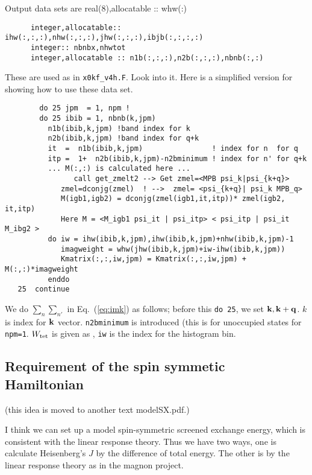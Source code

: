 \documentclass[a4paper,10pt,fleqn]{article}
\newcommand{\bfq}{{\bf q}}
\newcommand{\bfk}{{\bf k}}
\newcommand{\req}[1]{\mbox{Eq.~(\ref{#1})}}
\begin{document}
Output data sets are
      real(8),allocatable :: whw(:)
\begin{verbatim}
      integer,allocatable:: ihw(:,:,:),nhw(:,:,:),jhw(:,:,:),ibjb(:,:,:,:)
      integer:: nbnbx,nhwtot
      integer,allocatable :: n1b(:,:,:),n2b(:,:,:),nbnb(:,:)
\end{verbatim}
These are used as in \verb+x0kf_v4h.F+. Look into it. Here is a simplified version for showing how to use these data set.
\begin{verbatim}
        do 25 jpm  = 1, npm !
        do 25 ibib = 1, nbnb(k,jpm)
          n1b(ibib,k,jpm) !band index for k
          n2b(ibib,k,jpm) !band index for q+k
          it  =  n1b(ibib,k,jpm)                ! index for n  for q
          itp =  1+  n2b(ibib,k,jpm)-n2bminimum ! index for n' for q+k
          ... M(:,:) is calculated here ...  
            	call get_zmelt2 --> Get zmel=<MPB psi_k|psi_{k+q}>
             zmel=dconjg(zmel)  ! -->  zmel= <psi_{k+q}| psi_k MPB_q>
             M(igb1,igb2) = dconjg(zmel(igb1,it,itp))* zmel(igb2, it,itp)
             Here M = <M_igb1 psi_it | psi_itp> < psi_itp | psi_it M_ibg2 >
          do iw = ihw(ibib,k,jpm),ihw(ibib,k,jpm)+nhw(ibib,k,jpm)-1 
             imagweight = whw(jhw(ibib,k,jpm)+iw-ihw(ibib,k,jpm))
             Kmatrix(:,:,iw,jpm) = Kmatrix(:,:,iw,jpm) + M(:,:)*imagweight 
          enddo          
   25  continue
\end{verbatim}
We do $\sum_n \sum_{n'}$ in \req{eq:imk} as follows;
before this \verb#do 25#, we set $\bfk,\bfk+\bfq$. 
$k$ is index for $\bfk$ vector.
\verb+n2bminimum+ is introduced (this is for unoccupied states for \verb+npm=1+.
$W_{\rm tet}$ is given as \verb@imagweight@, \verb#iw# is 
the index for the histogram bin.


\subsection{Requirement of the spin symmetic Hamiltonian}
(this idea is moved to another text modelSX.pdf.)

I think we can set up a model spin-symmetric screened exchange energy, 
which is consistent with the linear response theory.
Thus we have two ways, one is calculate Heisenberg's $J$ by the
difference of total energy.
The other is by the linear response theory as in the magnon project.
\end{document}
